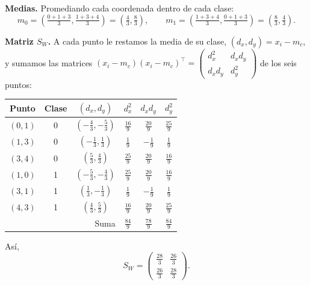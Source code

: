 \documentclass[11pt, letterpaper]{article}
\begin{document}
\textbf{Medias.} Promediando cada coordenada dentro de cada clase:
\[
    m_0 = \left(\tfrac{0+1+3}{3}, \tfrac{1+3+4}{3}\right) = \left(\tfrac43, \tfrac83\right), \qquad
    m_1 = \left(\tfrac{1+3+4}{3}, \tfrac{0+1+3}{3}\right) = \left(\tfrac83, \tfrac43\right).
\]

\textbf{Matriz $S_W$.} A cada punto le restamos la media de su clase, $(d_x, d_y) = x_i - m_{c}$, y sumamos las matrices $(x_i - m_c)(x_i - m_c)^\top = \begin{pmatrix} d_x^2 & d_x d_y \\ d_x d_y & d_y^2 \end{pmatrix}$ de los seis puntos:

\begin{center}
\begin{tabular}{ccc|ccc}
\toprule
Punto & Clase & $(d_x, d_y)$ & $d_x^2$ & $d_x d_y$ & $d_y^2$ \\
\midrule
$(0,1)$ & 0 & $(-\frac43, -\frac53)$ & $\frac{16}{9}$ & $\frac{20}{9}$ & $\frac{25}{9}$ \\[2pt]
$(1,3)$ & 0 & $(-\frac13, \frac13)$ & $\frac{1}{9}$ & $-\frac{1}{9}$ & $\frac{1}{9}$ \\[2pt]
$(3,4)$ & 0 & $(\frac53, \frac43)$ & $\frac{25}{9}$ & $\frac{20}{9}$ & $\frac{16}{9}$ \\[2pt]
$(1,0)$ & 1 & $(-\frac53, -\frac43)$ & $\frac{25}{9}$ & $\frac{20}{9}$ & $\frac{16}{9}$ \\[2pt]
$(3,1)$ & 1 & $(\frac13, -\frac13)$ & $\frac{1}{9}$ & $-\frac{1}{9}$ & $\frac{1}{9}$ \\[2pt]
$(4,3)$ & 1 & $(\frac43, \frac53)$ & $\frac{16}{9}$ & $\frac{20}{9}$ & $\frac{25}{9}$ \\
\midrule
\multicolumn{3}{r|}{Suma} & $\frac{84}{9}$ & $\frac{78}{9}$ & $\frac{84}{9}$ \\
\bottomrule
\end{tabular}
\end{center}
Así,
\[
    S_W = \begin{pmatrix} \frac{28}{3} & \frac{26}{3} \\[2pt] \frac{26}{3} & \frac{28}{3} \end{pmatrix}.
\]
\end{document}
